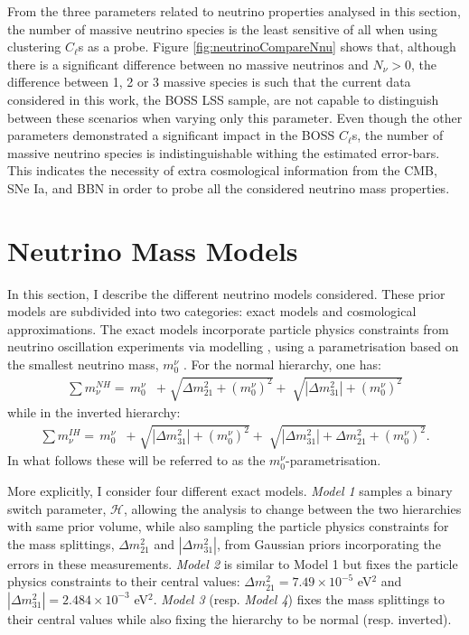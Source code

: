 From the three parameters related to neutrino properties analysed in this section, the number of massive neutrino species is the least sensitive of all when using clustering $C_{\ell}$s as a probe. Figure \ref{fig:neutrinoCompareNnu} shows that, although there is a significant difference between no massive neutrinos and $N_{\nu} > 0$, the difference between 1, 2 or 3 massive species is such that the current data considered in this work, the BOSS LSS sample, are not capable to distinguish between these scenarios when varying only this parameter. Even though the other parameters demonstrated a significant impact in the BOSS $C_{\ell}$s, the number of massive neutrino species is indistinguishable withing the estimated error-bars. This indicates the necessity of extra cosmological information from the CMB, SNe Ia, and BBN in order to probe all the considered neutrino mass properties.

\section{Neutrino Mass Models}

In this section, I describe the different neutrino models considered. These prior models are subdivided into two categories: exact models and cosmological approximations. The exact models incorporate particle physics constraints from neutrino oscillation experiments via modelling \NM{}, using a parametrisation based on the smallest neutrino mass, $m_0^{\nu}$ \citep{2012Hannestad,2016Hannestad,2018HeavensNeutrino}. For the normal hierarchy, one has:
\begin{align}
    \sum m_{\nu}^{NH} =\,  m^{\nu}_{0} & + \sqrt[]{\Delta m_{21}^2 + (m^{\nu}_{0})^2} + \sqrt[]{|\Delta m_{31}^2| + (m^{\nu}_{0})^2}
\end{align}
\noindent while in the inverted hierarchy: 
\begin{align}
    \sum m_{\nu}^{IH} =\,  m_0^{\nu} & + \sqrt[]{|\Delta m_{31}^2| + (m_0^{\nu})^2} + \sqrt[]{ |\Delta m_{31}^2| + \Delta m_{21}^2 + (m_0^{\nu})^2}.
\end{align} 
In what follows these will be referred to as the $m_0^{\nu}$-parametrisation. 

\qquad More explicitly, I consider four different exact models. \textit{Model 1} samples a binary switch parameter, $\mathcal{H}$, allowing the analysis to change between the two hierarchies with same prior volume, while also sampling the particle physics constraints for the mass splittings, $\Delta m_{21}^2$ and $|\Delta m_{31}^2|$, from Gaussian priors incorporating the errors in these measurements. \textit{Model 2} is similar to Model 1 but fixes the particle physics constraints to their central values: $\Delta m_{21}^2 = 7.49\times 10^{-5}$ eV$^2$ and $|\Delta m_{31}^2| = 2.484\times 10^{-3}$ eV$^2$. \textit{Model 3} (resp. \textit{Model 4}) fixes the mass splittings to their central values while also fixing the hierarchy to be normal (resp. inverted).


